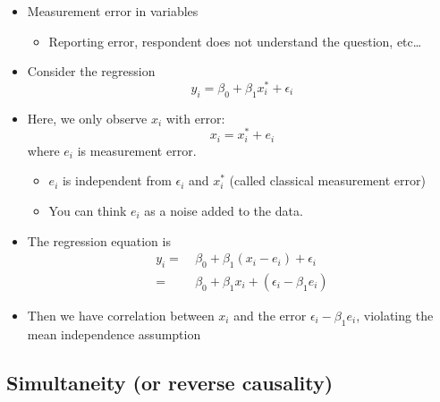 \documentclass[]{book}
\providecommand{\tightlist}{%
  \setlength{\itemsep}{0pt}\setlength{\parskip}{0pt}}
\begin{document}
\begin{itemize}
\tightlist
\item
  Measurement error in variables

  \begin{itemize}
  \tightlist
  \item
    Reporting error, respondent does not understand the question,
    etc\ldots{}
  \end{itemize}
\item
  Consider the regression \[
  y_{i}=\beta_{0}+\beta_{1}x_{i}^{*}+\epsilon_{i}
  \]
\item
  Here, we only observe \(x_{i}\) with error: \[
  x_{i}=x_{i}^{*}+e_{i}\] where \(e_{i}\) is measurement error.

  \begin{itemize}
  \tightlist
  \item
    \(e_{i}\) is independent from \(\epsilon_i\) and \(x_i^*\) (called
    classical measurement error)
  \item
    You can think \(e_i\) as a noise added to the data.
  \end{itemize}
\item
  The regression equation is \[
  \begin{aligned}
  y_{i} = & \  \beta_{0}+\beta_{1}(x_{i}-e_{i})+\epsilon_{i} \\
  = & \ \beta_{0}+\beta_{1}x_{i}+(\epsilon_{i}-\beta_{1}e_{i})
  \end{aligned}
  \]
\item
  Then we have correlation between \(x_{i}\) and the error
  \(\epsilon_{i}-\beta_{1}e_{i}\), violating the mean independence
  assumption
\end{itemize}

\subsection{Simultaneity (or reverse
causality)}\label{simultaneity-or-reverse-causality}
\end{document}
